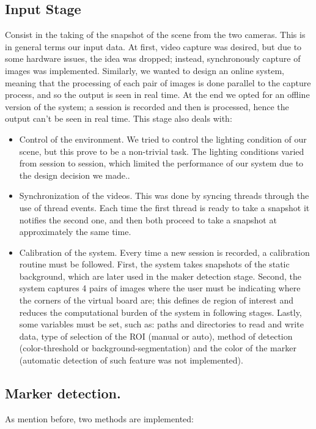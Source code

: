 \documentclass[a4paper,12pt]{article}
\begin{document}
\subsection{Input Stage}
Consist in the taking of the snapshot of the scene from the two cameras. This is in general terms our input data. At first, video capture was desired, but due to some hardware issues, the idea was dropped; instead, synchronously capture of images was implemented. Similarly, we wanted to design an online system, meaning that the processing of each pair of images is done parallel to the capture process, and so the output is seen in real time. At the end we opted for an offline version of the system; a session is recorded and then is processed, hence the output can't be seen in real time. 
This stage also deals with:
\begin{itemize}
        \item Control of the environment. We tried to control the lighting condition of our scene, but this prove to be a non-trivial task. The lighting conditions varied from session to session, which limited the performance of our system due to the design decision we made..
        \item Synchronization of the videos. This was done by syncing threads through the use of thread events. Each time the first thread is ready to take a snapshot it notifies the second one, and then both proceed to take a snapshot at approximately the same time.
        \item Calibration of the system. Every time a new session is recorded, a calibration routine must be followed. First, the system takes snapshots of the static background, which are later used in the maker detection stage. Second, the system captures 4 pairs of images where the user must be indicating where the corners of the virtual board are; this defines de region of interest and reduces the computational burden of the system in following stages. Lastly, some variables must be set, such as: paths and directories to read and write data, type of selection of the ROI (manual or auto), method of detection (color-threshold or background-segmentation) and the color of the marker (automatic detection of such feature was not implemented).
\end{itemize}

\subsection{Marker detection.}
As mention before, two methods are implemented:
\end{document}
